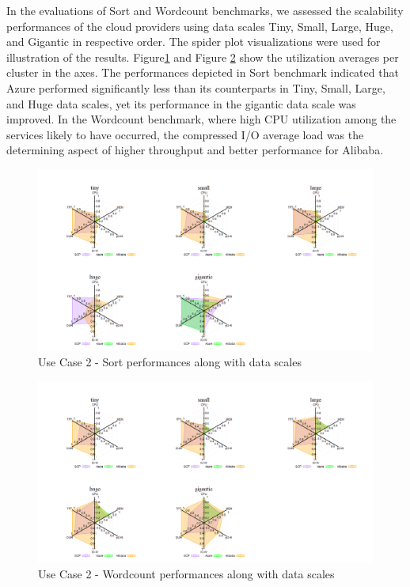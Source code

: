 \documentclass[review]{elsarticle}
\begin{document}
	
	In the evaluations of Sort and Wordcount benchmarks, we assessed the scalability performances of the cloud providers using data scales Tiny, Small, Large, Huge, and Gigantic in respective order. The spider plot visualizations were used for illustration of the results. Figure\ref{fig:uc2-srt-new} and Figure \ref{fig:uc2-wrdcnt-new} show the utilization averages per cluster in the axes. The performances depicted in Sort benchmark indicated that Azure performed significantly less than its counterparts in Tiny, Small, Large, and Huge data scales, yet its performance in the gigantic data scale was improved. In the Wordcount benchmark, where high CPU utilization among the services likely to have occurred, the compressed I/O average load was the determining aspect of higher throughput and better performance for Alibaba.
	
	\begin{figure}[p]
		\caption{Use Case 2 - Sort performances along with data scales}
		\label{fig:uc2-srt-new}
		\includegraphics[width=\textwidth]{uc2-srt-new}
		\centering
	\end{figure}
	
	\begin{figure}[p]
		\caption{Use Case 2 - Wordcount performances along with data scales}
		\label{fig:uc2-wrdcnt-new}
		\includegraphics[width=\textwidth]{uc2-wrdcnt-new}
		\centering
	\end{figure}
	
\end{document}
